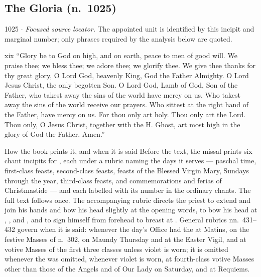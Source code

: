 \subsection*{The Gloria (n.~1025)}

\begin{appointed}{1025 $\cdot$ }
\textit{Focused source locator.} The appointed unit is identified by this incipit and marginal number; only phrases required by the analysis below are quoted.
\end{appointed}

\begin{englishwitness}{xix}
``Glory be to God on high, and on earth, peace to men of good will. We praise
thee; we bless thee; we adore thee; we glorify thee. We give thee thanks for thy
great glory, O Lord God, heavenly King, God the Father Almighty. O Lord Jesus
Christ, the only begotten Son. O Lord God, Lamb of God, Son of the Father, who
takest away the sins of the world have mercy on us. Who takest away the sins of
the world receive our prayers. Who sittest at the right hand of the Father, have
mercy on us. For thou only art holy. Thou only art the Lord. Thou only, O Jesus
Christ, together with the H. Ghost, art most high in the glory of God the
Father. Amen.''
\end{englishwitness}

\begin{rubricnote}{How the book prints it, and when it is said}
Before the text, the missal prints six chant incipits for , each under a rubric naming the days it serves --- paschal time,
first-class feasts, second-class feasts, feasts of the Blessed Virgin Mary,
Sundays through the year, third-class feasts, and commemorations and ferias of
Christmastide --- and each labelled with its number in the ordinary chants.
The full text follows once. The accompanying rubric directs the priest to
extend and join his hands and bow his head slightly at the opening words, to
bow his head at , ,
 and , and to sign
himself from forehead to breast at . General
rubrics nn.~431--432 govern when it is said: whenever the day's Office had the
 at Matins, on the festive Masses of n.~302, on Maundy
Thursday and at the Easter Vigil, and at votive Masses of the first three
classes unless violet is worn; it is omitted whenever the 
was omitted, whenever violet is worn, at fourth-class votive Masses other than
those of the Angels and of Our Lady on Saturday, and at Requiems.
\end{rubricnote}

